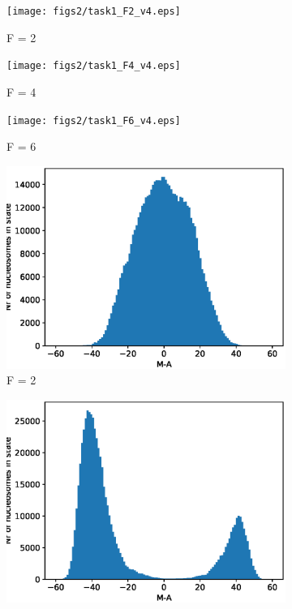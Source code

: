 \documentclass{article}
\begin{document}
\begin{figure}[H]
	\centering
	\begin{subfigure}[b]{.3\textwidth}
		\centering
		\texttt{[image: figs2/task1\_F2\_v4.eps]}
		\caption{F = 2}
		\label{fig:task1_F2}
	\end{subfigure}
	\begin{subfigure}[b]{.3\textwidth}
		\centering
		\texttt{[image: figs2/task1\_F4\_v4.eps]}
		\caption{F = 4}
		\label{fig:task1_F4}
	\end{subfigure}
	\begin{subfigure}[b]{.3\textwidth}
		\centering
		\texttt{[image: figs2/task1\_F6\_v4.eps]}
		\caption{F = 6}
		\label{fig:task1_F6}
	\end{subfigure}
	\begin{subfigure}[b]{.3\textwidth}
		\centering
		\includegraphics[width= \linewidth]{figs2/task1_F2_hist_v4.eps}
		\caption{F = 2}
		\label{fig:task1_F2_hist}
	\end{subfigure}
	\begin{subfigure}[b]{.3\textwidth}
		\centering
		\includegraphics[width= \linewidth]{figs2/task1_F4_hist_v4.eps}

\end{subfigure}
\end{figure}
\end{document}
